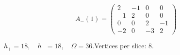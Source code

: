 \begin{minipage}{\linewidth}
\begin{minipage}[c]{0.495\linewidth}
\end{minipage}%
\begin{minipage}[c]{0.495\linewidth}\centering\fontsize{9.7}{12}\selectfont
\setlength{\abovedisplayskip}{4pt}\setlength{\belowdisplayskip}{4pt}
\setlength{\abovedisplayshortskip}{4pt}\setlength{\belowdisplayshortskip}{4pt}
\setlength{\arraycolsep}{3pt}\renewcommand{\arraystretch}{1.08}
\[A_{-}(1)=\begin{pmatrix}2 & -1 & 0 & 0\\-1 & 2 & 0 & 0\\0 & 0 & 2 & -1\\-2 & 0 & -3 & 2\end{pmatrix}\]
\end{minipage}%
\par\smallskip\noindent\small $h_+=18,\quad h_-=18,\quad \Omega=36.$\quad Vertices per slice: 8.
\end{minipage}\par\vfill
